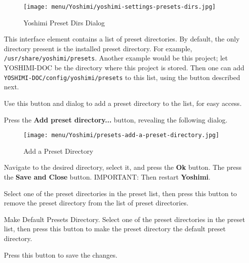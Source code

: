    \setcounter{ItemCounter}{0}      %

\begin{figure}[H]
   \centering 
   \texttt{[image: menu/Yoshimi/yoshimi-settings-presets-dirs.jpg]}
   \caption[Preset Dirs Tab]{Yoshimi Preset Dirs Dialog}
   \label{fig:yoshimi_presets_dirs_tab}
\end{figure}

   \setcounter{ItemCounter}{0}      %

   This interface element contains a list of preset directories.
   By default, the only directory present is the installed preset directory.
   For example, \texttt{/usr/share/yoshimi/presets}.
   Another example would be this project; let YOSHIMI-DOC be the directory
   where this project is stored.  Then one can add
   \texttt{YOSHIMI-DOC/config/yoshimi/presets} to this list, using the
   button described next.

   Use this button and dialog to add a preset directory to the list, for
   easy access.

   Press the \textbf{Add preset directory...} button, revealing the
   following dialog.

\begin{figure}[H]
   \centering 
   \texttt{[image: menu/Yoshimi/presets-add-a-preset-directory.jpg]}
   \caption[Add Preset Directory]{Add a Preset Directory}
   \label{fig:presets_add_a_preset_directory}
\end{figure}

   Navigate to the desired directory, select it, and press the \textbf{Ok}
   button.  The press the \textbf{Save and Close} button.
   IMPORTANT:  Then restart \textbf{Yoshimi}.

   Select one of the preset directories in the preset list, then press this
   button to remove the preset directory from the list of preset
   directories.

   Make Default Presets Directory.
   Select one of the preset directories in the preset list, then press this
   button to make the preset directory the default preset directory.

   Press this button to save the changes.

